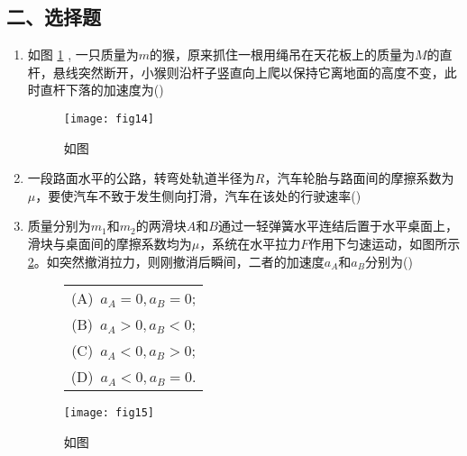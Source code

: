 \subsection*{二、选择题}
\begin{enumerate}
    \item  如图 \ref{fig:14} , 一只质量为$m$的猴，原来抓住一根用绳吊在天花板上的质量为$M$的直杆，悬线突然断开，小猴则沿杆子竖直向上爬以保持它离地面的高度不变，此时直杆下落的加速度为(\hspace{1pc})
    \begin{figure}[ht]
        \centering
        \texttt{[image: fig14]}
            \caption{如图}\label{fig:14}
    \end{figure}
    \item 一段路面水平的公路，转弯处轨道半径为$R$，汽车轮胎与路面间的摩擦系数为$\mu$，要使汽车不致于发生侧向打滑，汽车在该处的行驶速率(\hspace{1pc})
    \item 质量分别为$m_1$和$m_2$的两滑块$A$和$B$通过一轻弹簧水平连结后置于水平桌面上，滑块与桌面间的摩擦系数均为$\mu$，系统在水平拉力$F$作用下匀速运动，如图所示\ref{fig:15}。如突然撤消拉力，则刚撤消后瞬间，二者的加速度$a_A$和$a_B$分别为(\hspace{1pc}) 
    \begin{figure}[ht]
        \begin{minipage}[ht]{0.4\linewidth}
           \begin{table}[H]
               \begin{tabular}{c}
                  \qquad   (A)\ $a_A=0, a_B=0$;\\
                  \qquad  (B)\ $a_A>0, a_B<0$;\\
                  \qquad  (C)\ $a_A<0, a_B>0$;\\
                  \qquad  (D)\ $a_A<0, a_B=0$.
               \end{tabular}
           \end{table}
        \end{minipage}
        \begin{minipage}[H]{0.5\linewidth}
            \texttt{[image: fig15]}
            \caption{如图}\label{fig:15}
        \end{minipage}
    \end{figure}
\end{enumerate}
